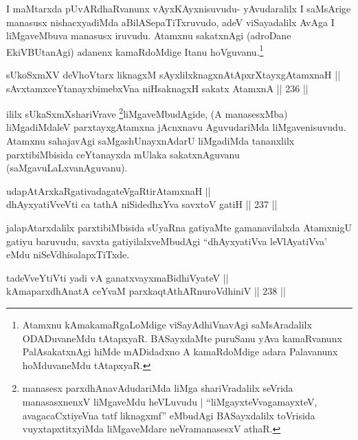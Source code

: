 \begin{artha}
I maMtarxda pUvARdhaRvanunx vAyxKAyxnisuvudu- yAvudaralilx I
saMsArige manasusx nishacxyadiMda aBilASepaTiTxruvudo, adeV
viSayadalilx AvAga I liMgaveMbuva manasusx iruvudu. Atamxnu sakatxnAgi
(adroDane EkiVBUtanAgi) adanenx kamaRdoMdige Itanu
hoVguvanu.\footnote{Atamxnu kAmakamaRgaLoMdige viSayAdhiVnavAgi
saMsAradalilx ODADuvaneMdu tAtapxyaR. BASayxdaMte puruSanu yAva
kamaRvanunx PalAsakatxnAgi hiMde mADidadxno A kamaRdoMdige adara
Palavanunx hoMduvaneMdu tAtapxyaR.}
\end{artha}


\begin{shl}
sUkoSxmXV deVhoV\s tarx liknagxM sAyxlilxknagxnAtApxrXtayxgAtamxnaH || \\
sAvxtamxceYtanayxbimebxVna niHsaknagxH sakatx AtamxnA \hfill || 236 ||  
\end{shl}

\begin{artha}
ililx sUkaSxmXshariVrave \footnote{manasesx parxdhAnavAdudariMda liMga
shariVradalilx seVrida manasasxnenxV liMgaveMdu heVLuvudu |
``liMgayxteV\s vagamayxteV, avagacaCxtiyeVna tatf liknagxmf'' eMbudAgi BASayxdalilx toVrisida vuyxtapxtitxyiMda
liMgaveMdare neVramanasesxV athaR.}liMgaveMbudAgide, (A manasesxMba)
liMgadiMdaleV parxtayxgAtamxna jAcnxnavu AguvudariMda liMgavenisuvudu.
Atamxnu sahajavAgi saMgashUnayxnAdarU liMgadiMda tananxlilx
parxtibiMbisida ceYtanayxda mUlaka sakatxnAguvanu
(saMgavuLaLxvanAguvanu).
\end{artha}


\begin{shl}
udapAtArxkaRgativadagateVgaRtirAtamxnaH || \\
dhAyxyatiVveVti ca tathA niSidedhxYva savxtoV gatiH \hfill || 237 ||  
\end{shl}

\begin{artha}
jalapAtarxdalilx parxtibiMbisida sUyaRna gatiyaMte gamanavilalxda
AtamxnigU gatiyu baruvudu, savxta gatiyilalxveMbudAgi ``dhAyxyatiVva
leVlAyatiVva' eMdu niSeVdhisalapxTiTxde.
\end{artha}



\begin{shl}
tadeVveYtiVti yadi vA ganatxvayxmaBidhiVyateV || \\
kAmaparxdhAnatA ceYvaM parxkaqtAthARnuroVdhiniV \hfill || 238 ||  
\end{shl}

